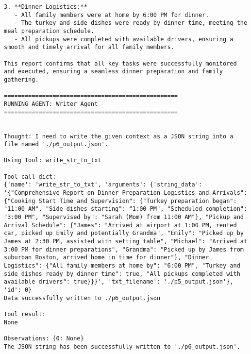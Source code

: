 \begin{lstlisting}[style=JSONStyle, caption=Sample JSON Output from Agent Pipeline, label=lst:data_collection]
3. **Dinner Logistics:**
   - All family members were at home by 6:00 PM for dinner.
   - The turkey and side dishes were ready by dinner time, meeting the meal preparation schedule.
   - All pickups were completed with available drivers, ensuring a smooth and timely arrival for all family members.

This report confirms that all key tasks were successfully monitored and executed, ensuring a seamless dinner preparation and family gathering.

==================================================
RUNNING AGENT: Writer Agent
==================================================


Thought: I need to write the given context as a JSON string into a file named './p6_output.json'.

Using Tool: write_str_to_txt

Tool call dict: 
{'name': 'write_str_to_txt', 'arguments': {'string_data': '{"Comprehensive Report on Dinner Preparation Logistics and Arrivals": {"Cooking Start Time and Supervision": {"Turkey preparation began": "11:00 AM", "Side dishes starting": "1:00 PM", "Scheduled completion": "3:00 PM", "Supervised by": "Sarah (Mom) from 11:00 AM"}, "Pickup and Arrival Schedule": {"James": "Arrived at airport at 1:00 PM, rented car, picked up Emily and potentially Grandma", "Emily": "Picked up by James at 2:30 PM, assisted with setting table", "Michael": "Arrived at 3:00 PM for dinner preparations", "Grandma": "Picked up by James from suburban Boston, arrived home in time for dinner"}, "Dinner Logistics": {"All family members at home by": "6:00 PM", "Turkey and side dishes ready by dinner time": true, "All pickups completed with available drivers": true}}}', 'txt_filename': './p5_output.json'}, 'id': 0}
Data successfully written to ./p6_output.json

Tool result: 
None

Observations: {0: None}
The JSON string has been successfully written to './p6_output.json'.

\end{lstlisting}

